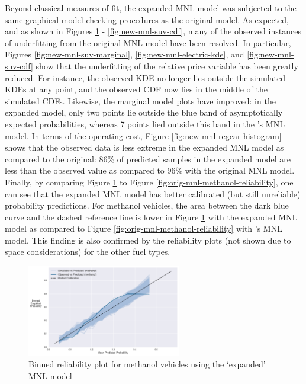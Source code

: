 \documentclass[preprint]{elsarticle}
\begin{document}
Beyond classical measures of fit, the expanded MNL model was subjected to the same graphical model checking procedures as the original model. As expected, and as shown in Figures \ref{fig:new-mnl-methanol-reliability} - \ref{fig:new-mnl-suv-cdf}, many of the observed instances of underfitting from the original MNL model have been resolved. In particular, Figures \ref{fig:new-mnl-suv-marginal}, \ref{fig:new-mnl-electric-kde}, and \ref{fig:new-mnl-suv-cdf} show that the underfitting of the relative price variable has been greatly reduced. For instance, the observed KDE no longer lies outside the simulated KDEs at any point, and the observed CDF now lies in the middle of the simulated CDFs. Likewise, the marginal model plots have improved: in the expanded model, only two points lie outside the blue band of asymptotically expected probabilities, whereas 7 points lied outside this band in the \citeauthor{brownstone_forecasting_1998}'s MNL model. In terms of the operating cost, Figure \ref{fig:new-mnl-regcar-histogram} shows that the observed data is less extreme in the expanded MNL model as compared to the original: 86\% of predicted samples in the expanded model are less than the observed value as compared to 96\% with the original MNL model. Finally, by comparing Figure \ref{fig:new-mnl-methanol-reliability} to Figure \ref{fig:orig-mnl-methanol-reliability}, one can see that the expanded MNL model has better calibrated (but still unreliable) probability predictions. For methanol vehicles, the area between the dark blue curve and the dashed reference line is lower in Figure \ref{fig:new-mnl-methanol-reliability} with the expanded MNL model as compared to Figure \ref{fig:orig-mnl-methanol-reliability} with \citeauthor{brownstone_forecasting_1998}'s MNL model. This finding is also confirmed by the reliability plots (not shown due to space considerations) for the other fuel types.

\begin{figure}
\centering
\includegraphics[width=0.6\textwidth]{reliability-plot-vehicle-choice-interaction-mnl-methanol-point}
\caption{Binned reliability plot for methanol vehicles using the `expanded' MNL model}
\label{fig:new-mnl-methanol-reliability}
\end{figure}
\end{document}
